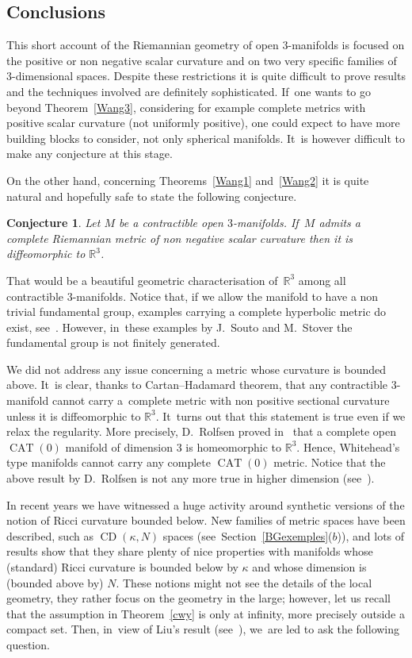 \documentclass[pdftex]{sigma}
\numberwithin{equation}{section}
\newtheorem{Conjecture}[theor]{Conjecture}
\newcommand{\CDCD}{\operatorname{CD}}
\newcommand{\CAT}{\operatorname{CAT}}
\begin{document}
\subsection{Conclusions}

This short account of the Riemannian geometry of open $3$-manifolds is focused on the positive or non negative scalar curvature and on two very specific families of~$3$-dimensional spaces. Despite these restrictions it is quite difficult to prove results and the techniques involved are definitely sophisticated. If~one wants to go beyond Theorem~\ref{Wang3}, considering for example complete metrics with positive scalar curvature (not uniformly positive), one could expect to have more building blocks to consider, not only spherical manifolds. It~is however difficult to make any conjecture at this stage.

On the other hand, concerning Theorems~\ref{Wang1} and~\ref{Wang2} it is quite natural and hopefully safe to state the following conjecture.

\begin{Conjecture}
Let $M$ be a contractible open $3$-manifolds. If~$M$ admits a complete Riemannian metric of non negative scalar curvature then it is diffeomorphic
to $\mathbb{R}^{3}$.
\end{Conjecture}

That would be a beautiful geometric characterisation of~$\mathbb{R}^{3}$ among all contractible $3$-mani\-folds. Notice that, if we allow the manifold to have a non trivial fundamental group, examples carrying a complete hyperbolic metric do exist, see~\cite{Sou-Sto}. However, in~these examples by J.~Souto and M.~Stover the fundamental group is not finitely generated.

We did not address any issue concerning a metric whose curvature is bounded above. It~is clear, thanks to Cartan--Hadamard theorem, that any contractible $3$-manifold cannot carry a~complete metric with non positive sectional curvature unless it is diffeomorphic to $\mathbb{R}^{3}$. It~turns
out that this statement is true even if we relax the regularity. More precisely, D.~Rolfsen proved in~\cite{Rolf} that a complete open $\CAT(0)$ manifold of dimension $3$ is homeomorphic to $\mathbb{R}^{3}$. Hence, Whitehead's type manifolds cannot carry any complete $\CAT(0)$ metric. Notice
that the above result by D.~Rolfsen is not any more true in higher dimension (see~\cite{D-J}).

In recent years we have witnessed a huge activity around synthetic versions of the notion of Ricci curvature bounded below. New families of metric
spaces have been described, such as $\CDCD (\kappa, N)$ spaces (see~Section~\ref{BGexemples}($b$)), and lots of results show that they share plenty of
nice properties with manifolds whose (standard) Ricci curvature is bounded below by $\kappa$ and whose dimension is (bounded above by) $N$. These notions might not see the details of the local geometry, they rather focus on the geometry in the large; however, let us recall that the assumption in Theorem~\ref{cwy} is only at infinity, more precisely outside a compact set. Then, in~view of Liu's result (see~\cite{Liu}), we~are led to ask the following question.
\end{document}

